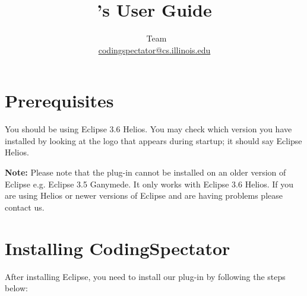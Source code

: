 \documentclass{article}
\title{\codspec's User Guide}
\author{\codspec\
Team\\\href{mailto:codingspectator@cs.illinois.edu}{codingspectator@cs.illinois.edu}}
\newcommand\codspec{CodingSpectator}
\newcommand\warnnote[1]{\textbf{Note: }#1}
\begin{document}
%
\maketitle
%
\tableofcontents
%
\section{Prerequisites}
%
You should be using Eclipse 3.6 Helios. You may check which version you have
installed by looking at the logo that appears during startup; it should say
Eclipse Helios.

\warnnote{Please note that the plug-in cannot be installed on an older version
of Eclipse e.g. Eclipse 3.5 Ganymede. It only works with Eclipse 3.6 Helios. If
you are using Helios or newer versions of Eclipse and are having problems please
contact us.}
%
\section{Installing \codspec}

After installing Eclipse, you need to install our plug-in by following the steps
below:
\end{document}
